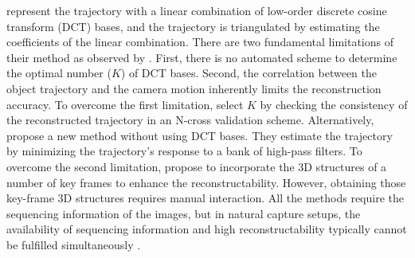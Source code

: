 \citet{Park_ECCV2010} represent the trajectory with a linear combination of low-order discrete cosine transform (DCT) bases, and the trajectory is triangulated by estimating the coefficients of the linear combination.
There are two fundamental limitations of their method as observed by \citet{Valmadre_CVPR2012}.
First, there is no automated scheme to determine the optimal number ($K$) of DCT bases.
Second, the correlation between the object trajectory and the camera motion inherently limits the reconstruction accuracy.
To overcome the first limitation, \citet{park20153d} select $K$ by checking the consistency of the reconstructed trajectory in an N-cross validation scheme.
Alternatively, \citet{Valmadre_CVPR2012} propose a new method without using DCT bases. They estimate the trajectory by minimizing the trajectory's response to a bank of high-pass filters.
To overcome the second limitation,
\citet{ZhuCL_CVPR11} propose to incorporate the 3D structures of a number of key frames to enhance the reconstructability. However, obtaining those key-frame 3D structures requires manual interaction. 
All the methods \cite{Park_ECCV2010,Valmadre_CVPR2012,ZhuCL_CVPR11} require the sequencing information of the images, 
but in natural capture setups, the availability of sequencing information and high reconstructability typically cannot be fulfilled simultaneously \cite{ZhuCL_CVPR11,park20153d}. 



